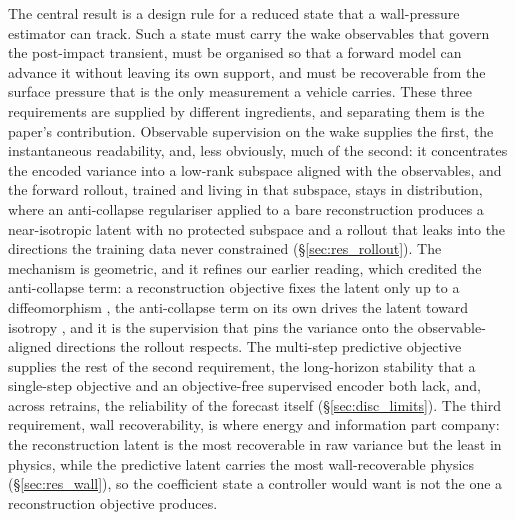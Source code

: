 The central result is a design rule for a reduced state that a wall-pressure estimator can track. Such a state must carry the wake observables that govern the post-impact transient, must be organised so that a forward model can advance it without leaving its own support, and must be recoverable from the surface pressure that is the only measurement a vehicle carries. These three requirements are supplied by different ingredients, and separating them is the paper's contribution. Observable supervision on the wake supplies the first, the instantaneous readability, and, less obviously, much of the second: it concentrates the encoded variance into a low-rank subspace aligned with the observables, and the forward rollout, trained and living in that subspace, stays in distribution, where an anti-collapse regulariser applied to a bare reconstruction produces a near-isotropic latent with no protected subspace and a rollout that leaks into the directions the training data never constrained (\S\ref{sec:res_rollout}). The mechanism is geometric, and it refines our earlier reading, which credited the anti-collapse term: a reconstruction objective fixes the latent only up to a diffeomorphism \citep{kelshaw2024}, the anti-collapse term on its own drives the latent toward isotropy \citep{broustail2026}, and it is the supervision that pins the variance onto the observable-aligned directions the rollout respects. The multi-step predictive objective supplies the rest of the second requirement, the long-horizon stability that a single-step objective and an objective-free supervised encoder both lack, and, across retrains, the reliability of the forecast itself (\S\ref{sec:disc_limits}). The third requirement, wall recoverability, is where energy and information part company: the reconstruction latent is the most recoverable in raw variance but the least in physics, while the predictive latent carries the most wall-recoverable physics (\S\ref{sec:res_wall}), so the coefficient state a controller would want is not the one a reconstruction objective produces.\re

